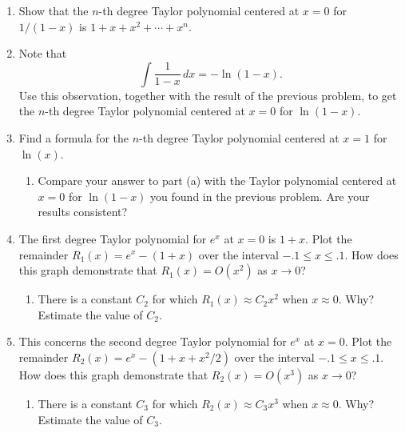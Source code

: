 \begin{enumerate}
  \begin{enumerate}
  \item Recall that $\tan(x) =\sin(x)/\cos(x)$.  Multiply the 5-th degree
Taylor polynomial for $\tan(x)$ from part a) by the 4-th degree Taylor
polynomial for $\cos(x)$ and show that you get the fifth degree
polynomial for $\sin(x)$ (discarding higher degree terms).


\end{enumerate}
\item Show that the $n$-th degree Taylor polynomial centered at $x=0$
for $1/(1-x)$ is $1+x+x^2+\cdots+x^n$.


\item Note that
\[
\int \frac{1}{1-x}\, dx = -\ln(1-x).
\]
Use this observation, together with the result of the previous
problem, to get the $n$-th degree Taylor polynomial centered at $x=0$
for $\ln(1-x)$.


\item Find a formula for the $n$-th degree Taylor polynomial centered
at $x=1$ for $\ln(x)$.

  \begin{enumerate}
  \item Compare your answer to part (a) with the Taylor polynomial
centered at $x=0$ for $\ln(1-x)$ you found in the previous problem.
Are your results consistent?


\end{enumerate}
\item The first degree Taylor polynomial for $e^x$ at $x=0$ is $1+x$.
Plot the remainder $R_1(x) = e^x - (1+x)$ over the interval $-.1 \leq
x \leq .1$.  How does this graph demonstrate that $R_1(x) = O(x^2)$ as
$x \rightarrow 0$?

  \begin{enumerate}
  \item There is a constant $C_2$ for which $R_1(x) \approx C_2 x^2$ when
$x \approx 0$.  Why?  Estimate the value of $C_2$.


\end{enumerate}
\item This concerns the second degree Taylor polynomial for $e^x$ at
$x=0$.  Plot the remainder $R_2(x) = e^x - (1 + x + x^2/2)$ over the
interval $-.1 \leq x \leq .1$.  How does this graph demonstrate that
$R_2(x) = O(x^3)$ as $x \rightarrow 0$?

  \begin{enumerate}
  \item There is a constant $C_3$ for which $R_2(x) \approx C_3 x^3$ when
$x \approx 0$.  Why?  Estimate the value of $C_3$.



\end{enumerate}
\end{enumerate}
